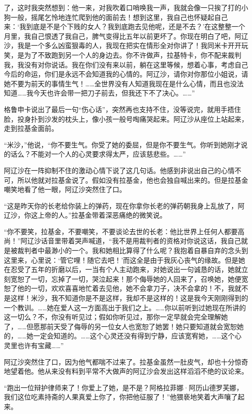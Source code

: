 了，这时我突然想到：他一来，对我吹着口哨唤我一声，我就会像一只挨了打的小狗一般，摇尾乞怜地连忙爬到他的面前去！想到这里，我自己也怀疑起自己来：‘我到底是不是个下贱的女人？我到底跑去见他呢，还是不去？’在这整整一个月里，我自己恨透了我自己，脾气变得比五年以前更坏了。你现在明白了吧，阿辽沙，我是一个多么凶蛮狠毒的人，我现在把实在情形全对你讲了！我同米卡开开玩笑，是为了不致跑到另一个人的身边去。你不许做声，拉基特卡，你不配来裁判我，我没有对你说话。我在你们没有来以前，躺在这里等候，想着心事，考虑自己今后的命运，你们是永远不会知道我的心情的。阿辽沙，请你对你那位小姐说，请她不要为前天的事情生气！……全世界没有人知道我现在是什么心情，而且也没法知道……我今天也许会带一把刀子前去，但我还下不了决心。……”
\par 格鲁申卡说出了最后一句“伤心话”，突然再也支持不住，没等说完，就用手捂住脸，投身扑到沙发的枕头上，像小孩一般号啕痛哭起来。阿辽沙从座位上站起来，走到拉基金面前。
\par “米沙，”他说，“你不要生气。你受了她的委屈，但是你不要生气。你听到她刚才说的话么？不能对一个人的心灵要求得太严，应该慈悲些。……”
\par 阿辽沙在一阵抑制不住的激动心情下说了这几句话。他感到非说出自己的心情不可，所以他就对拉基金说了。假如没有拉基金，他也会独自喊出来的。但是拉基金嘲笑地看了他一眼，阿辽沙突然住了口。
\par “这是昨天你的长老给你装上的弹药，现在你拿你长老的弹药朝我身上乱放了，阿辽沙，你这上帝的人。”拉基金带着深恶痛绝的微笑说。
\par “你不要笑，拉基金，不要嘲笑，不要谈论去世的长老：他比世界上任何人都要高尚！”阿辽沙话音里带着哭声喊道，“我不是用裁判者的资格对你说这话，我自己就是被裁判者中最渺小的一个。我和她相比算得了什么呢？我抱着自暴自弃的念头到这里来，心里说：‘管它哩！随它去吧！’而这全是由于我灰心丧气的缘故。但是她在忍受了五年的折磨以后，一当有个人主动跑来，对她说出一句诚恳的话，她就立刻宽恕了一切，忘掉了一切，哭泣起来！那个侮辱她的人回来了，召唤她，她便宽恕了他的一切，欢欢喜喜地忙着去见他，她不会拿刀子，决不会拿的！不，我就不是这样！米沙，我不知道你是不是这样，我却不是这样的！这是我今天刚刚得到的一个教训。……她在爱人这一方面高出于我们之上。……你以前听到过她现在所讲的这一切么？不，你没有听见过；假如你听见过，那你一定早就会完全理解她了，……但愿那前天受了侮辱的另一位女人也宽恕了她罢！她只要知道就会宽恕她的，……她一定会知道的。……这个心灵还没有得到宁静，应该宽宥她，……这个心灵里也许有宝藏……”
\par 阿辽沙突然住了口，因为他气都喘不过来了。拉基金虽然一肚皮气，却也十分惊奇地望着他。他从来没有料到平常不大做声的阿辽沙会发出这样滔滔不绝的议论来。
\par “跑出一位辩护律师来了！你爱上了她，是不是？阿格拉菲娜·阿历山德罗芙娜，我们这位吃素持斋的人果真爱上你了，你把他征服了！”他猥亵地笑着大声嚷了起来。
